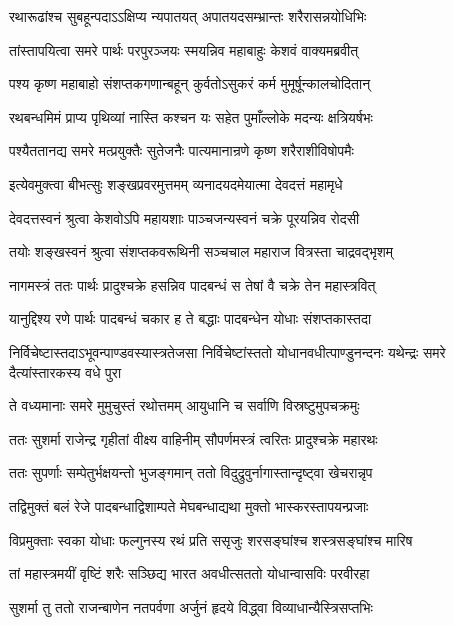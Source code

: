 \twolineshloka
{रथारूढांश्च सुबहून्पदाऽऽक्षिप्य न्यपातयत्}
{अपातयदसम्भ्रान्तः शरैरासन्नयोधिभिः}


\twolineshloka
{तांस्तापयित्वा समरे पार्थः परपुरञ्जयः}
{स्मयन्निव महाबाहुः केशवं वाक्यमब्रवीत्}


\twolineshloka
{पश्य कृष्ण महाबाहो संशप्तकगणान्बहून्}
{कुर्वतोऽसुकरं कर्म मुमूर्षून्कालचोदितान्}


\twolineshloka
{रथबन्धमिमं प्राप्य पृथिव्यां नास्ति कश्चन}
{यः सहेत पुमाँल्लोके मदन्यः क्षत्रियर्षभः}


\twolineshloka
{पश्यैततानद्य समरे मत्प्रयुक्तैः सुतेजनैः}
{पात्यमानान्रणे कृष्ण शरैराशीविषोपमैः}


\twolineshloka
{इत्येवमुक्त्वा बीभत्सुः शङ्खप्रवरमुत्तमम्}
{व्यनादयदमेयात्मा देवदत्तं महामृधे}


\twolineshloka
{देवदत्तस्वनं श्रुत्वा केशवोऽपि महायशाः}
{पाञ्चजन्यस्वनं चक्रे पूरयन्निव रोदसी}


\twolineshloka
{तयोः शङ्खस्वनं श्रुत्वा संशप्तकवरूथिनी}
{सञ्चचाल महाराज वित्रस्ता चाद्रवद्भृशम्}


\twolineshloka
{नागमस्त्रं ततः पार्थः प्रादुश्चक्रे हसन्निव}
{पादबन्धं स तेषां वै चक्रे तेन महास्त्रवित्}


\twolineshloka
{यानुद्दिश्य रणे पार्थः पादबन्धं चकार ह}
{ते बद्धाः पादबन्धेन योधाः संशप्तकास्तदा}


\threelineshloka
{निर्विचेष्टास्तदाऽभूवन्पाण्डवस्यास्त्रतेजसा}
{निर्विचेष्टांस्ततो योधानवधीत्पाण्डुनन्दनः}
{यथेन्द्रः समरे दैत्यांस्तारकस्य वधे पुरा}


\twolineshloka
{ते वध्यमानाः समरे मुमुचुस्तं रथोत्तमम्}
{आयुधानि च सर्वाणि विस्रष्टुमुपचक्रमुः}


\twolineshloka
{ततः सुशर्मा राजेन्द्र गृहीतां वीक्ष्य वाहिनीम्}
{सौपर्णमस्त्रं त्वरितः प्रादुश्चक्रे महारथः}


\twolineshloka
{ततः सुपर्णाः सम्पेतुर्भक्षयन्तो भुजङ्गमान्}
{ततो विदुद्रुवुर्नागास्तान्दृष्ट्वा खेचरान्नृप}


\twolineshloka
{तद्विमुक्तं बलं रेजे पादबन्धाद्विशाम्पते}
{मेघबन्धाद्यथा मुक्तो भास्करस्तापयन्प्रजाः}


\twolineshloka
{विप्रमुक्ताः स्वका योधाः फल्गुनस्य रथं प्रति}
{ससृजुः शरसङ्घांश्च शस्त्रसङ्घांश्च मारिष}


\twolineshloka
{तां महास्त्रमयीं वृष्टिं शरैः सञ्छिद्य भारत}
{अवधीत्सततो योधान्वासविः परवीरहा}


\twolineshloka
{सुशर्मा तु ततो राजन्बाणेन नतपर्वणा}
{अर्जुनं हृदये विद्ध्वा विव्याधान्यैस्त्रिसप्तभिः}



